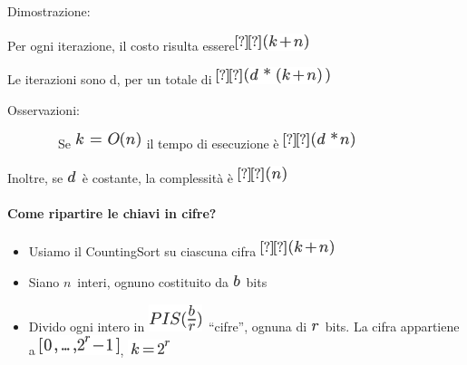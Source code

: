 \documentclass{article}
\providecommand{\tightlist}{%
  \setlength{\itemsep}{0pt}\setlength{\parskip}{0pt}}
\let\oldparagraph\paragraph
\renewcommand{\paragraph}[1]{\oldparagraph{#1}\mbox{}}
\begin{document}
{Dimostrazione:}

{Per ogni iterazione, il costo risulta essere}\includegraphics{images/image198.png}

{Le iterazioni sono d, per un totale di
}\includegraphics{images/image196.png}

{Osservazioni}{:}

{~~~~~~~~Se }\includegraphics{images/image189.png}{~il tempo di
esecuzione è }\includegraphics{images/image199.png}

{Inoltre, se }\includegraphics{images/image197.png}{~è
costante, la complessità è }\includegraphics{images/image149.png}

\hypertarget{h.u6e4yemegdiq}{\paragraph{\texorpdfstring{{Come ripartire
le chiavi in
cifre?}}{Come ripartire le chiavi in cifre?}}\label{h.u6e4yemegdiq}}

\begin{itemize}
\tightlist
\item
  {Usiamo il CountingSort su ciascuna cifra
  }\includegraphics{images/image198.png}
\item
  {Siano }$n${~interi, ognuno
  costituito da }\includegraphics{images/image200.png}{~bits}
\item
  {Divido ogni intero in
  }\includegraphics{images/image201.png}{~``cifre'', ognuna di
  }\includegraphics{images/image83.png}{~bits. La cifra appartiene a
  }\includegraphics{images/image202.png}{,
  }\includegraphics{images/image203.png}
\end{itemize}
\end{document}
